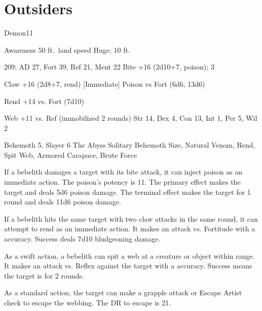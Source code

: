 \section{Outsiders}

    \begin{monsection}[Bebelith]{Demon}{11}
        \begin{spellcontent}
            \begin{spelltargetinginfo}
                \pari {} Awareness 
                \pari {} 50 ft.\ land speed
                \pari {} Huge;  10 ft.
            \end{spelltargetinginfo}
            \begin{spelleffects}
                \pari {} 209;  AD 27, Fort 39, Ref 21, Ment 22
                \pari {} Bite +16 (2d10+7, poison);  3
                \par Claw +16 (2d8+7, rend)
                \pari {} [Immediate] Poison  vs Fort (6d6, 13d6)
                \par [Immediate] Rend +14 vs. Fort (7d10)
                \par [Swift] Web +11 vs. Ref (immobilized 2 rounds)
                \pari {} Str 14, Dex 4, Con 13, Int 1, Per 5, Wil 2
            \end{spelleffects}
        \end{spellcontent}
        \begin{spellfooter}
            \pari {} Behemoth 5, Slayer 6
            \pari {} The Abyss
            \pari {} Solitary
            \pari {} Behemoth Size, Natural Venom, Rend, Spit Web, Armored Carapace, Brute Force
        \end{spellfooter}
    \end{monsection}

     If a bebelith damages a target with its bite attack, it can inject poison as an immediate action.
    The poison's potency is 11.
    The primary effect makes the target \sickened and deals 5d6 poison damage.
    The terminal effect makes the target \nauseated for 1 round and deals 11d6 poison damage.

     If a bebelith hits the same target with two claw attacks in the same round, it can attempt to rend as an immediate action.
    It makes an attack vs. Fortitude with a  accuracy.
    Success deals 7d10 bludgeoning damage.

     As a swift action, a bebelith can spit a web at a creature or object within \rngmed range.
    It makes an attack vs. Reflex against the target with a  accuracy.
    Success means the target is \immobilized for 2 rounds.

    As a standard action, the target can make a grapple attack or Escape Artist check to escape the webbing.
    The DR to escape is 21.
